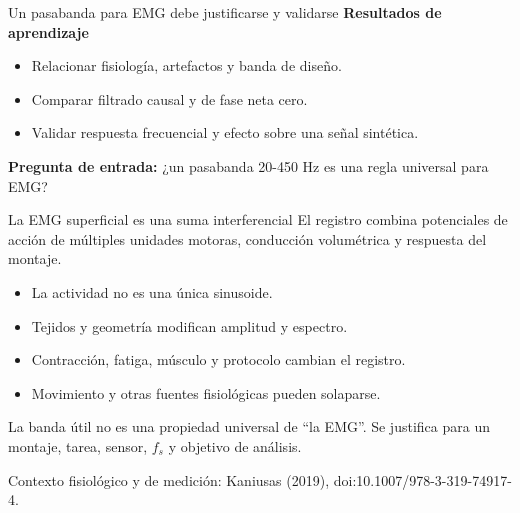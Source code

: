 \documentclass[
  ignorenonframetext,
  aspectratio=169,
  spanish,
  professionalfonts]{beamer}
\providecommand{\tightlist}{%
  \setlength{\itemsep}{0pt}\setlength{\parskip}{0pt}}
\begin{document}
\begin{frame}{Un pasabanda para EMG debe justificarse y validarse}
\protect{}\label{un-pasabanda-para-emg-debe-justificarse-y-validarse}
\textbf{Resultados de aprendizaje}

\begin{itemize}
\tightlist
\item
  Relacionar fisiología, artefactos y banda de diseño.
\item
  Comparar filtrado causal y de fase neta cero.
\item
  Validar respuesta frecuencial y efecto sobre una señal sintética.
\end{itemize}

\textbf{Pregunta de entrada:} ¿un pasabanda 20-450 Hz es una regla
universal para EMG?
\end{frame}

\begin{frame}{La EMG superficial es una suma interferencial}
\protect{}\label{la-emg-superficial-es-una-suma-interferencial}
El registro combina potenciales de acción de múltiples unidades motoras,
conducción volumétrica y respuesta del montaje.

\begin{itemize}
\tightlist
\item
  La actividad no es una única sinusoide.
\item
  Tejidos y geometría modifican amplitud y espectro.
\item
  Contracción, fatiga, músculo y protocolo cambian el registro.
\item
  Movimiento y otras fuentes fisiológicas pueden solaparse.
\end{itemize}

\begin{tcolorbox}[enhanced jigsaw, arc=.35mm, bottomrule=.15mm, bottomtitle=1mm, breakable, colback=white, colbacktitle=quarto-callout-important-color!10!white, colframe=quarto-callout-important-color-frame, coltitle=black, left=2mm, leftrule=.75mm, opacityback=0, opacitybacktitle=0.6, rightrule=.15mm, title={Concepto principal}, titlerule=0mm, toprule=.15mm, toptitle=1mm]

La banda útil no es una propiedad universal de ``la EMG''. Se justifica
para un montaje, tarea, sensor, \(f_s\) y objetivo de análisis.

\end{tcolorbox}

Contexto fisiológico y de medición: Kaniusas (2019),
doi:10.1007/978-3-319-74917-4.
\end{frame}
\end{document}
